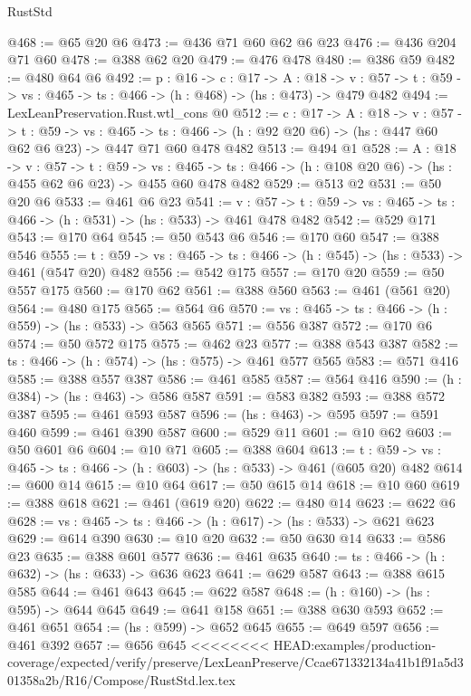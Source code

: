 \begin{lexlean}{RustStd}
\begin{coremodule}
{\begin{coremodule}
@468 := @65 @20 @6
@473 := @436 @71 @60 @62 @6 @23
@476 := @436 @204 @71 @60
@478 := @388 @62 @20
@479 := @476 @478
@480 := @386 @59
@482 := @480 @64 @6
@492 := {p : @16} ->
  {c : @17} ->
  {A : @18} ->
  {v : @57} -> {t : @59} -> {vs : @465} -> {ts : @466} -> (h : @468) -> (hs : @473) -> @479 @482
@494 := LexLeanPreservation.Rust.wtl_cons @0
@512 := {c : @17} ->
  {A : @18} ->
  {v : @57} ->
  {t : @59} ->
  {vs : @465} ->
  {ts : @466} -> (h : @92 @20 @6) -> (hs : @447 @60 @62 @6 @23) -> @447 @71 @60 @478 @482
@513 := @494 @1
@528 := {A : @18} ->
  {v : @57} ->
  {t : @59} ->
  {vs : @465} -> {ts : @466} -> (h : @108 @20 @6) -> (hs : @455 @62 @6 @23) -> @455 @60 @478 @482
@529 := @513 @2
@531 := @50 @20 @6
@533 := @461 @6 @23
@541 := {v : @57} ->
  {t : @59} -> {vs : @465} -> {ts : @466} -> (h : @531) -> (hs : @533) -> @461 @478 @482
@542 := @529 @171
@543 := @170 @64
@545 := @50 @543 @6
@546 := @170 @60
@547 := @388 @546
@555 := {t : @59} -> {vs : @465} -> {ts : @466} -> (h : @545) -> (hs : @533) -> @461 (@547 @20) @482
@556 := @542 @175
@557 := @170 @20
@559 := @50 @557 @175
@560 := @170 @62
@561 := @388 @560
@563 := @461 (@561 @20)
@564 := @480 @175
@565 := @564 @6
@570 := {vs : @465} -> {ts : @466} -> (h : @559) -> (hs : @533) -> @563 @565
@571 := @556 @387
@572 := @170 @6
@574 := @50 @572 @175
@575 := @462 @23
@577 := @388 @543 @387
@582 := {ts : @466} -> (h : @574) -> (hs : @575) -> @461 @577 @565
@583 := @571 @416
@585 := @388 @557 @387
@586 := @461 @585
@587 := @564 @416
@590 := (h : @384) -> (hs : @463) -> @586 @587
@591 := @583 @382
@593 := @388 @572 @387
@595 := @461 @593 @587
@596 := (hs : @463) -> @595
@597 := @591 @460
@599 := @461 @390 @587
@600 := @529 @11
@601 := @10 @62
@603 := @50 @601 @6
@604 := @10 @71
@605 := @388 @604
@613 := {t : @59} -> {vs : @465} -> {ts : @466} -> (h : @603) -> (hs : @533) -> @461 (@605 @20) @482
@614 := @600 @14
@615 := @10 @64
@617 := @50 @615 @14
@618 := @10 @60
@619 := @388 @618
@621 := @461 (@619 @20)
@622 := @480 @14
@623 := @622 @6
@628 := {vs : @465} -> {ts : @466} -> (h : @617) -> (hs : @533) -> @621 @623
@629 := @614 @390
@630 := @10 @20
@632 := @50 @630 @14
@633 := @586 @23
@635 := @388 @601 @577
@636 := @461 @635
@640 := {ts : @466} -> (h : @632) -> (hs : @633) -> @636 @623
@641 := @629 @587
@643 := @388 @615 @585
@644 := @461 @643
@645 := @622 @587
@648 := (h : @160) -> (hs : @595) -> @644 @645
@649 := @641 @158
@651 := @388 @630 @593
@652 := @461 @651
@654 := (hs : @599) -> @652 @645
@655 := @649 @597
@656 := @461 @392
@657 := @656 @645
<<<<<<<< HEAD:examples/production-coverage/expected/verify/preserve/LexLeanPreserve/Ccae671332134a41b1f91a5d301358a2b/R16/Compose/RustStd.lex.tex

\end{coremodule}}
\end{coremodule}
\end{lexlean}
